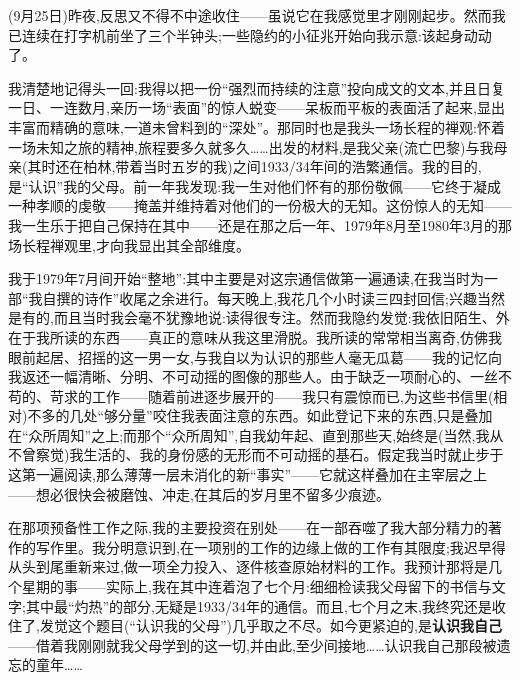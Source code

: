(9月25日)昨夜,反思又不得不中途收住——虽说它在我感觉里才刚刚起步。然而我已连续在打字机前坐了三个半钟头;一些隐约的小征兆开始向我示意:该起身动动了。

我清楚地记得头一回:我得以把一份“强烈而持续的注意”投向成文的文本,并且日复一日、一连数月,亲历一场“表面”的惊人蜕变——呆板而平板的表面活了起来,显出丰富而精确的意味,一道未曾料到的“深处”。那同时也是我头一场长程的禅观:怀着一场未知之旅的精神,旅程要多久就多久……出发的材料,是我父亲(流亡巴黎)与我母亲(其时还在柏林,带着当时五岁的我)之间1933/34年间的浩繁通信。我的目的,是“认识”我的父母。前一年我发现:我一生对他们怀有的那份敬佩——它终于凝成一种孝顺的虔敬——掩盖并维持着对他们的一份极大的无知。这份惊人的无知——我一生乐于把自己保持在其中——还是在那之后一年、1979年8月至1980年3月的那场长程禅观里,才向我显出其全部维度。

我于1979年7月间开始“整地”:其中主要是对这宗通信做第一遍通读,在我当时为一部“我自撰的诗作”收尾之余进行。每天晚上,我花几个小时读三四封回信;兴趣当然是有的,而且当时我会毫不犹豫地说:读得很专注。然而我隐约发觉:我依旧陌生、外在于我所读的东西——真正的意味从我这里滑脱。我所读的常常相当离奇,\dmark{}仿佛我眼前起居、招摇的这一男一女,与我自以为认识的那些人毫无瓜葛——我的记忆向我返还一幅清晰、分明、不可动摇的图像的那些人。由于缺乏一项耐心的、一丝不苟的、苛求的工作——随着前进逐步展开的——我只有震惊而已,为这些书信里(相对)不多的几处“够分量”咬住我表面注意的东西。如此登记下来的东西,只是叠加在“众所周知”之上;而那个“众所周知”,自我幼年起、直到那些天,始终是(当然,我从不曾察觉)我生活的、我的身份感的无形而不可动摇的基石。假定我当时就止步于这第一遍阅读,那么薄薄一层未消化的新“事实”——它就这样叠加在主宰层之上——想必很快会被磨蚀、冲走,在其后的岁月里不留多少痕迹。

在那项预备性工作之际,我的主要投资在别处——在一部吞噬了我大部分精力的著作的写作里。我分明意识到,在一项别的工作的边缘上做的工作有其限度;我迟早得从头到尾重新来过,做一项全力投入、逐件核查原始材料的工作。我预计那将是几个星期的事——实际上,我在其中连着泡了七个月:细细检读我父母留下的书信与文字;其中最“灼热”的部分,无疑是1933/34年的通信。而且,七个月之末,我终究还是收住了,发觉这个题目(“认识我的父母”)几乎取之不尽。如今更紧迫的,是\textbf{认识我自己}——借着我刚刚就我父母学到的这一切,并由此,至少间接地……认识我自己那段被遗忘的童年……

